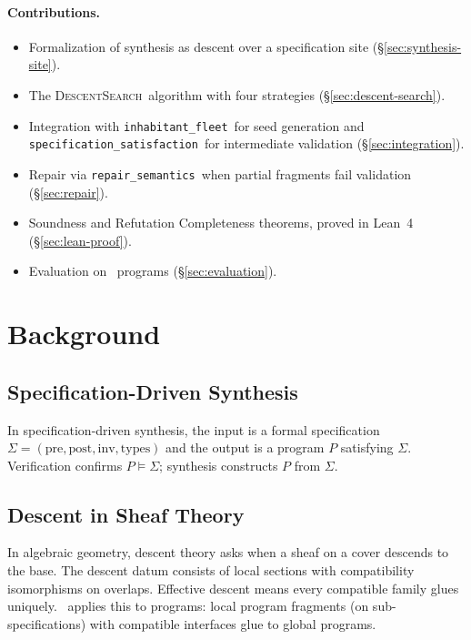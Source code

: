 \documentclass[11pt]{article}
\newcommand{\DescentSearch}{\textsc{DescentSearch}}
\newcommand{\SpecSat}{\texttt{specification\_satisfaction}}
\newcommand{\InhabFleet}{\texttt{inhabitant\_fleet}}
\newcommand{\RepairSem}{\texttt{repair\_semantics}}
\begin{document}
\paragraph{Contributions.}
\begin{itemize}[noitemsep]
  \item Formalization of synthesis as descent over a specification
        site (§\ref{sec:synthesis-site}).
  \item The \DescentSearch\ algorithm with four strategies
        (§\ref{sec:descent-search}).
  \item Integration with \InhabFleet\ for seed generation and
        \SpecSat\ for intermediate validation
        (§\ref{sec:integration}).
  \item Repair via \RepairSem\ when partial fragments fail
        validation (§\ref{sec:repair}).
  \item Soundness and Refutation Completeness theorems, proved in
        Lean~4 (§\ref{sec:lean-proof}).
  \item Evaluation on \expTotalPrograms\ programs
        (§\ref{sec:evaluation}).
\end{itemize}

\section{Background}\label{sec:background}

\subsection{Specification-Driven Synthesis}
In specification-driven synthesis, the input is a formal specification
$\Sigma = (\text{pre}, \text{post}, \text{inv}, \text{types})$ and
the output is a program $P$ satisfying $\Sigma$.  Verification
confirms $P \models \Sigma$; synthesis constructs $P$ from $\Sigma$.

\subsection{Descent in Sheaf Theory}
In algebraic geometry, descent theory asks when a sheaf on a cover
descends to the base.  The descent datum consists of local sections
with compatibility isomorphisms on overlaps.  Effective descent
means every compatible family glues uniquely.  \JuGeo\ applies this
to programs: local program fragments (on sub-specifications) with
compatible interfaces glue to global programs.
\end{document}
